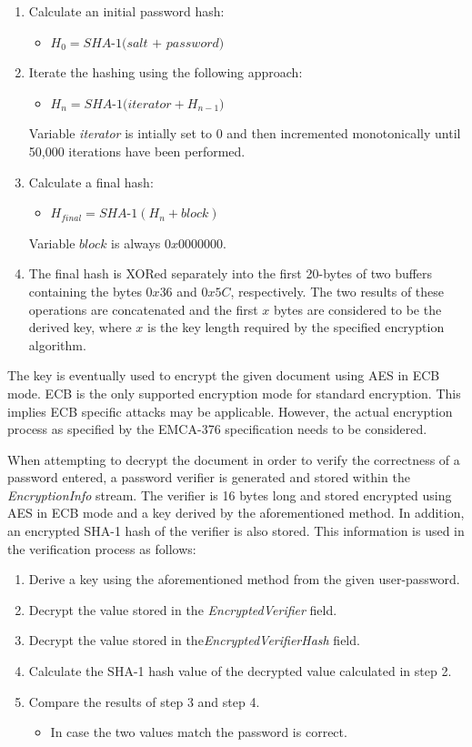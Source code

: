 \documentclass[11pt,oneside]{fithesis2}
\begin{document}
\begin{enumerate}
\item{Calculate an initial password hash:}
	\begin{itemize}
		\item{$H_0 =\textit{SHA-1(salt + password)}$}
	\end{itemize}
\item{Iterate the hashing using the following approach: 
	\begin{itemize}
		\item{$H_n = \textit{SHA-1(iterator} + H_{n-1})$}
	\end{itemize}
	Variable \textit{iterator} is intially set to 0 and then incremented monotonically until 50,000 iterations have been performed.}
\item{Calculate a final hash:
	\begin{itemize}
		\item{$H_{final} = \textit{SHA-1}(H_n + block)$}
	\end{itemize}
	Variable $block$ is always $0x0000000$.}
\item{The final hash is XORed separately into the first 20-bytes of two buffers containing the bytes $0x36$ and $0x5C$, respectively. The two results of these operations are concatenated and the first $x$ bytes are considered to be the derived key, where $x$ is the key length required by the specified encryption algorithm.}
\end{enumerate}

The key is eventually used to encrypt the given document using AES in ECB mode. ECB is the only supported encryption mode for standard encryption. This implies ECB specific attacks may be applicable. However, the actual encryption process as specified by the EMCA-376 specification needs to be considered. 

When attempting to decrypt the document in order to verify the correctness of a password entered, a password verifier is generated and stored within the \textit{EncryptionInfo} stream. The verifier is 16 bytes long and stored encrypted using AES in ECB mode and a key derived by the aforementioned method. In addition, an encrypted SHA-1 hash of the verifier is also stored. This information is used in the verification process as follows:

\begin{enumerate}
\setlength\itemsep{0.1em}
\item{Derive a key using the aforementioned method from the given user-password.}
\item{Decrypt the value stored in the \textit{EncryptedVerifier} field.}
\item{Decrypt the value stored in the\textit{EncryptedVerifierHash} field.}
\item{Calculate the SHA-1 hash value of the decrypted value calculated in step 2.}
\item{Compare the results of step 3 and step 4. 
	\begin{itemize}
		\item{In case the two values match the password is correct.}
	\end{itemize}}
\end{enumerate}
\end{document}

